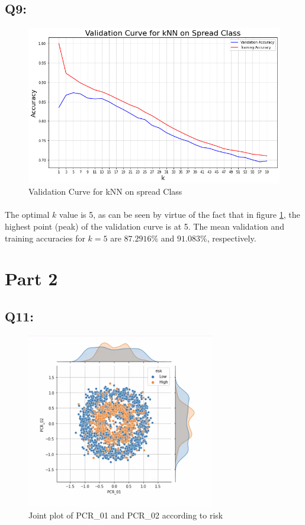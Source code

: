\documentclass{article}
\begin{document}
\subsection*{Q9:}
    \begin{figure}[H]
        \centering
        \includegraphics[scale=0.5]{q9.png}
        \caption{Validation Curve for kNN on spread Class}
        \label{fig:q9}
    \end{figure}
    \paragraph*{}
    The optimal $k$ value is 5, as can be seen by virtue of the fact that in figure \ref{fig:q9}, the highest point (peak) of the validation curve is at 5. The mean validation and training accuracies for $k=5$ are $87.2916\%$ and $91.083\%$, respectively.
\section*{Part 2}
\subsection*{Q11:}
    \begin{figure}[H]
        \centering
        \includegraphics{q11_pcr_01_pcr_02_j_plot.png}
        \caption{Joint plot of PCR\_01 and PCR\_02 according to risk}
        \label{fig:pcr_01_pcr_02_j_plot}
    \end{figure}
\end{document}
